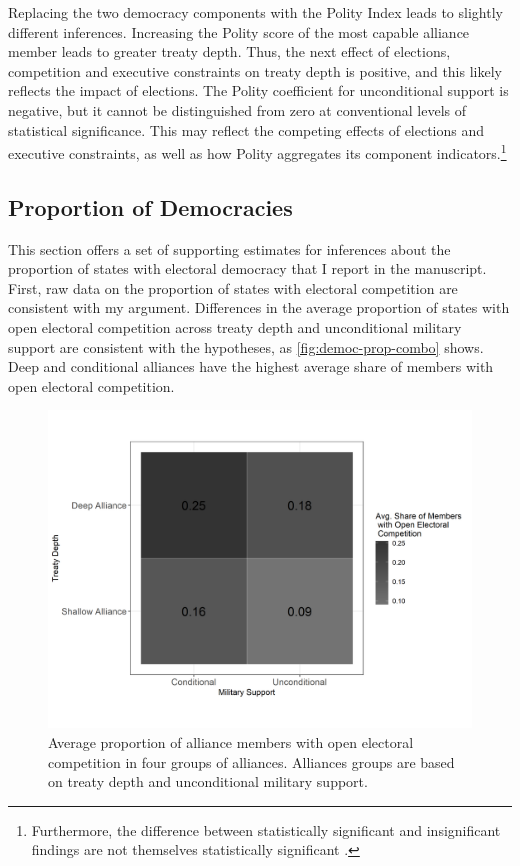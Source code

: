 \documentclass[12pt]{article}
\begin{document}
Replacing the two democracy components with the Polity Index leads to slightly different inferences. 
Increasing the Polity score of the most capable alliance member leads to greater treaty depth.
Thus, the next effect of elections, competition and executive constraints on treaty depth is positive, and this likely reflects the impact of elections. 
The Polity coefficient for unconditional support is negative, but it cannot be distinguished from zero at conventional levels of statistical significance. 
This may reflect the competing effects of elections and executive constraints, as well as how Polity aggregates its component indicators.\footnote{Furthermore, the difference between statistically significant and insignificant findings are not themselves statistically significant \citep{GelmanStern2006}.}



\subsection{Proportion of Democracies}


This section offers a set of supporting estimates for inferences about the proportion of states with electoral democracy that I report in the manuscript. 
First, raw data on the proportion of states with electoral competition are consistent with my argument. 
Differences in the average proportion of states with open electoral competition across treaty depth and unconditional military support are consistent with the hypotheses, as \autoref{fig:democ-prop-combo} shows.
Deep and conditional alliances have the highest average share of members with open electoral competition.


\begin{figure}
\includegraphics[width=.95\textwidth]{democ-prop-combo.png}  
\caption{Average proportion of alliance members with open electoral competition in four groups of alliances. Alliances groups are based on treaty depth and unconditional military support.}
\label{fig:democ-prop-combo}
\end{figure}
\end{document}
